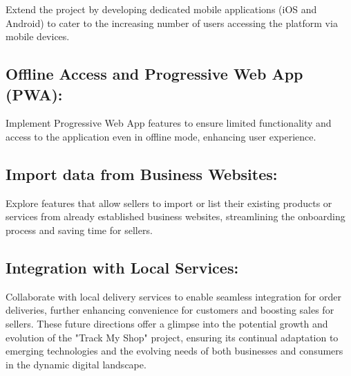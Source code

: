 Extend the project by developing dedicated mobile applications (iOS and Android) to cater to the increasing number of users accessing the platform via mobile devices.

\subsection{Offline Access and Progressive Web App (PWA):}

Implement Progressive Web App features to ensure limited functionality and access to the application even in offline mode, enhancing user experience.

\subsection{Import data from Business Websites:}

Explore features that allow sellers to import or list their existing products or services from already established business websites, streamlining the onboarding process and saving time for sellers.

\subsection{Integration with Local Services:}

Collaborate with local delivery services to enable seamless integration for order deliveries, further enhancing convenience for customers and boosting sales for sellers.
These future directions offer a glimpse into the potential growth and evolution of the "Track My Shop" project, ensuring its continual adaptation to emerging technologies and the evolving needs of both businesses and consumers in the dynamic digital landscape.

